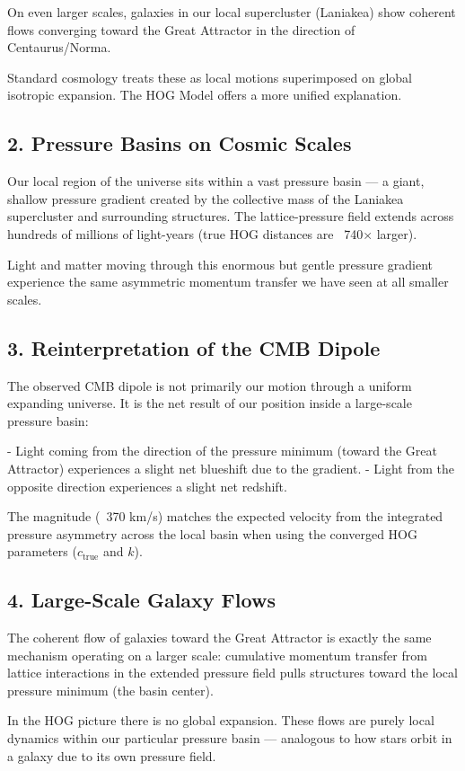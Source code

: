 \documentclass[11pt,a4paper]{book}
\begin{document}
On even larger scales, galaxies in our local supercluster (Laniakea) show coherent flows converging toward the Great Attractor in the direction of Centaurus/Norma.

Standard cosmology treats these as local motions superimposed on global isotropic expansion. The HOG Model offers a more unified explanation.

\subsection{2. Pressure Basins on Cosmic Scales}
Our local region of the universe sits within a vast pressure basin — a giant, shallow pressure gradient created by the collective mass of the Laniakea supercluster and surrounding structures. The lattice-pressure field extends across hundreds of millions of light-years (true HOG distances are ~740× larger).

Light and matter moving through this enormous but gentle pressure gradient experience the same asymmetric momentum transfer we have seen at all smaller scales.

\subsection{3. Reinterpretation of the CMB Dipole}
The observed CMB dipole is not primarily our motion through a uniform expanding universe. It is the net result of our position inside a large-scale pressure basin:

- Light coming from the direction of the pressure minimum (toward the Great Attractor) experiences a slight net blueshift due to the gradient.
- Light from the opposite direction experiences a slight net redshift.

The magnitude (~370 km/s) matches the expected velocity from the integrated pressure asymmetry across the local basin when using the converged HOG parameters (\( c_{\text{true}} \) and \( k \)).

\subsection{4. Large-Scale Galaxy Flows}
The coherent flow of galaxies toward the Great Attractor is exactly the same mechanism operating on a larger scale: cumulative momentum transfer from lattice interactions in the extended pressure field pulls structures toward the local pressure minimum (the basin center).

In the HOG picture there is no global expansion. These flows are purely local dynamics within our particular pressure basin — analogous to how stars orbit in a galaxy due to its own pressure field.
\end{document}
